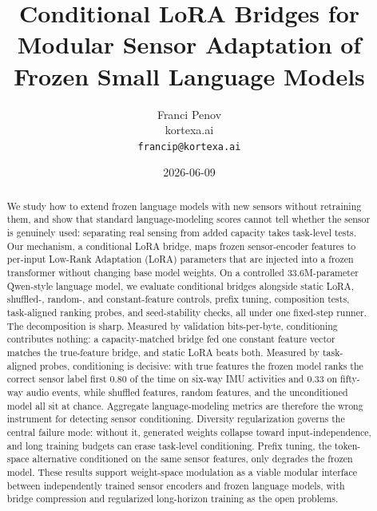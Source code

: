 \documentclass[11pt]{article}
\title{Conditional LoRA Bridges for Modular Sensor Adaptation of Frozen Small Language Models}
\author{Franci Penov \\ kortexa.ai \\ \texttt{francip@kortexa.ai}}
\date{2026-06-09}
\begin{document}
\maketitle

\begin{abstract}
We study how to extend frozen language models with new sensors without retraining them, and show that standard language-modeling scores cannot tell whether the sensor is genuinely used: separating real sensing from added capacity takes task-level tests. Our mechanism, a conditional LoRA bridge, maps frozen sensor-encoder features to per-input Low-Rank Adaptation (LoRA) parameters that are injected into a frozen transformer without changing base model weights. On a controlled 33.6M-parameter Qwen-style language model, we evaluate conditional bridges alongside static LoRA, shuffled-, random-, and constant-feature controls, prefix tuning, composition tests, task-aligned ranking probes, and seed-stability checks, all under one fixed-step runner. The decomposition is sharp. Measured by validation bits-per-byte, conditioning contributes nothing: a capacity-matched bridge fed one constant feature vector matches the true-feature bridge, and static LoRA beats both. Measured by task-aligned probes, conditioning is decisive: with true features the frozen model ranks the correct sensor label first 0.80 of the time on six-way IMU activities and 0.33 on fifty-way audio events, while shuffled features, random features, and the unconditioned model all sit at chance. Aggregate language-modeling metrics are therefore the wrong instrument for detecting sensor conditioning. Diversity regularization governs the central failure mode: without it, generated weights collapse toward input-independence, and long training budgets can erase task-level conditioning. Prefix tuning, the token-space alternative conditioned on the same sensor features, only degrades the frozen model. These results support weight-space modulation as a viable modular interface between independently trained sensor encoders and frozen language models, with bridge compression and regularized long-horizon training as the open problems.
\end{abstract}
\end{document}
